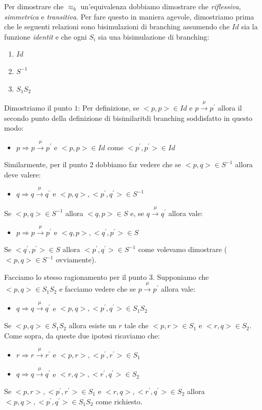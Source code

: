 		Per dimostrare che $\approx_{b}$ \eacc un'equivalenza dobbiamo dimostrare che \eacc \emph{riflessiva}, \emph{simmetrica} e \emph{transitiva}. Per fare questo in maniera agevole, dimostriamo prima che le seguenti relazioni sono bisimulazioni di branching assumendo che $Id$ sia la funzione \emph{identit\aacc} e che ogni $S_{i}$ sia una bisimulazione di branching:
		\begin{enumerate}
			\item $Id$
			\item $S^{-1}$
			\item $S_{1}S_{2}$
		\end{enumerate}
		
		Dimostriamo il punto $1$:
		Per definizione, se $<p,p>\in Id$ e $p \xrightarrow{\mu}p^{'}$ allora il secondo punto della definizione di bisimilarit\aacc di branching \eacc soddisfatto in questo modo:
		\begin{itemize}
			\item $p \Rightarrow p\xrightarrow{\mu}p^{'}$ e $<p,p>\in Id$ come $<p^{'},p^{'}>\in Id$
		\end{itemize}
		
		Similarmente, per il punto $2$ dobbiamo far vedere che se $<p,q>\in S^{-1}$ allora deve valere:
		\begin{itemize}
			\item $q \Rightarrow q\xrightarrow{\mu}q^{'}$ e $<p,q>,<p^{'},q^{'}>\in S^{-1}$
		\end{itemize}
		Se $<p,q>\in S^{-1}$ allora $<q,p>\in S$ e, se $q \xrightarrow{\mu}q^{'}$ allora vale:
		\begin{itemize}
			\item $p \Rightarrow p\xrightarrow{\mu}p^{'}$ e $<q,p>,<q^{'},p^{'}>\in S$
		\end{itemize}
		Se $<q^{'},p^{'}>\in S$ allora $<p^{'},q^{'}>\in S^{-1}$ come volevamo dimostrare ($<p,q> \in S^{-1}$ ovviamente).
		
		\vspace{5 mm}
		Facciamo lo stesso ragionamento per il punto $3$. Supponiamo che $<p,q>\in S_{1}S_{2}$ e facciamo vedere che se $p \xrightarrow{\mu}p^{'}$ allora vale:
		\begin{itemize}
			\item $q \Rightarrow q\xrightarrow{\mu}q^{'}$ e $<p,q>,<p^{'},q^{'}>\in S_{1}S_{2}$
		\end{itemize}
		Se $<p,q>\in S_{1}S_{2}$ allora esiste un $r$ tale che $<p,r>\in S_{1}$ e $<r,q>\in S_{2}$. Come sopra, da queste due ipotesi ricaviamo che:
		\begin{itemize}
			\item $r \Rightarrow r\xrightarrow{\mu}r^{'}$ e $<p,r>,<p^{'},r^{'}>\in S_{1}$
			\item $q \Rightarrow q\xrightarrow{\mu}q^{'}$ e $<r,q>,<r^{'},q^{'}>\in S_{2}$
		\end{itemize}
		Se $<p,r>,<p^{'},r^{'}>\in S_{1}$ e $<r,q>,<r^{'},q^{'}>\in S_{2}$ allora $<p,q>,<p^{'},q^{'}>\in S_{1}S_{2}$ come richiesto.
		
